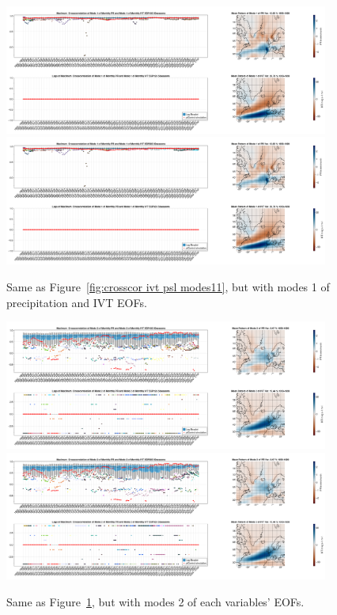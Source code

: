 \begin{figure}
  \begin{center}
    \includegraphics[width=0.95\textwidth]{figures/crosscorrelation_boxplot_pr_ivt_modes11_ssp126_50seasons.png}
    \includegraphics[width=0.95\textwidth]{figures/crosscorrelation_boxplot_pr_ivt_modes11_ssp585_50seasons.png}
  \end{center}
  \caption{Same as Figure~\ref{fig:crosscor ivt psl modes11}, but with modes 1 of precipitation and IVT EOFs.}\label{fig:crosscor pr ivt modes11}
\end{figure}

\begin{figure}
  \begin{center}
    \includegraphics[width=0.95\textwidth]{figures/crosscorrelation_boxplot_pr_ivt_modes22_ssp126_50seasons.png}
    \includegraphics[width=0.95\textwidth]{figures/crosscorrelation_boxplot_pr_ivt_modes22_ssp585_50seasons.png}
  \end{center}
  \caption{Same as Figure~\ref{fig:crosscor pr ivt modes11}, but with modes 2 of each variables' EOFs.}\label{fig:crosscor pr ivt modes22}
\end{figure}


